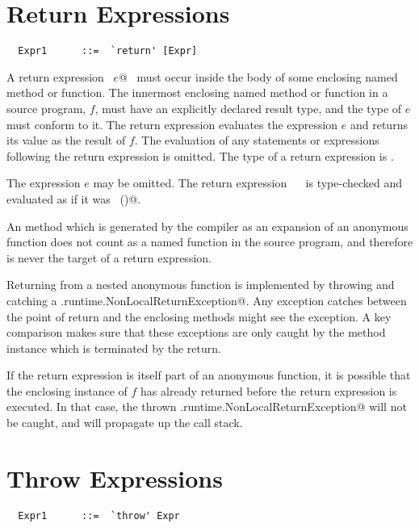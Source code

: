 \section{Return Expressions}

\syntax\begin{lstlisting}
  Expr1      ::=  `return' [Expr]
\end{lstlisting}

A return expression ~\lstinline@return $e$@~ must occur inside the body of some
enclosing named method or function. The innermost enclosing named
method or function in a source program, $f$, must have an explicitly declared result type,
and the type of $e$ must conform to it.  
The return expression
evaluates the expression $e$ and returns its value as the result of
$f$. The evaluation of any statements or
expressions following the return expression is omitted. The type of 
a return expression is .

The expression $e$ may be omitted.  The return expression
~\lstinline@return@~ is type-checked and evaluated as if it was ~\lstinline@return ()@.

An \lstinline@apply@ method which is generated by the compiler as an
expansion of an anonymous function does not count as a named function
in the source program, and therefore is never the target of a return
expression.

Returning from a nested anonymous function is implemented by throwing
and catching a \lstinline@scala.runtime.NonLocalReturnException@.  Any
exception catches between the point of return and the enclosing
methods might see the exception.  A key comparison makes sure that
these exceptions are only caught by the method instance which is
terminated by the return.

If the return expression is itself part of an anonymous function, it
is possible that the enclosing instance of $f$ has already returned
before the return expression is executed. In that case, the thrown
\lstinline@scala.runtime.NonLocalReturnException@ will not be caught,
and will propagate up the call stack.



\section{Throw Expressions}

\syntax\begin{lstlisting}
  Expr1      ::=  `throw' Expr
\end{lstlisting}


